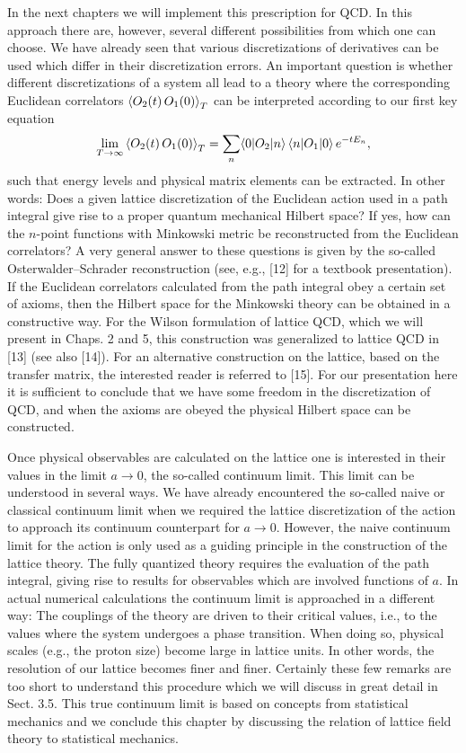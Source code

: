 In the next chapters we will implement this prescription for QCD. In this
approach there are, however, several different possibilities from which one can
choose. We have already seen that various discretizations of derivatives can be
used which differ in their discretization errors. An important question is
whether different discretizations of a system all lead to a theory where the
corresponding Euclidean correlators $\left\langle O_2(t)\,O_1(0) \right\rangle_T$ can be interpreted
according to our first key equation
\begin{equation}
  \lim_{T\to\infty}\left\langle O_2(t)\,O_1(0) \right\rangle_T
  = \sum_n \langle0|O_2|n\rangle\,\langle n|O_1|0\rangle\,e^{-tE_n},
\end{equation}
such that energy levels and physical matrix elements can be extracted. In other
words: Does a given lattice discretization of the Euclidean action used in a
path integral give rise to a proper quantum mechanical Hilbert space? If yes,
how can the $n$-point functions with Minkowski metric be reconstructed from the
Euclidean correlators? A very general answer to these questions is given by the
so-called Osterwalder--Schrader reconstruction (see, e.g., [12] for a textbook
presentation). If the Euclidean correlators calculated from the path integral
obey a certain set of axioms, then the Hilbert space for the Minkowski theory
can be obtained in a constructive way. For the Wilson formulation of lattice
QCD, which we will present in Chaps. 2 and 5, this construction was generalized
to lattice QCD in [13] (see also [14]). For an alternative construction on the
lattice, based on the transfer matrix, the interested reader is referred to
[15]. For our presentation here it is sufficient to conclude that we have some
freedom in the discretization of QCD, and when the axioms are obeyed the
physical Hilbert space can be constructed.

Once physical observables are calculated on the lattice one is interested in
their values in the limit $a \to 0$, the so-called continuum limit. This limit
can be understood in several ways. We have already encountered the so-called
naive or classical continuum limit when we required the lattice discretization
of the action to approach its continuum counterpart for $a \to 0$. However, the
naive continuum limit for the action is only used as a guiding principle in the
construction of the lattice theory. The fully quantized theory requires the
evaluation of the path integral, giving rise to results for observables which
are involved functions of $a$. In actual numerical calculations the continuum
limit is approached in a different way: The couplings of the theory are driven
to their critical values, i.e., to the values where the system undergoes a
phase transition. When doing so, physical scales (e.g., the proton size) become
large in lattice units. In other words, the resolution of our lattice becomes
finer and finer. Certainly these few remarks are too short to understand this
procedure which we will discuss in great detail in Sect. 3.5. This true
continuum limit is based on concepts from statistical mechanics and we conclude
this chapter by discussing the relation of lattice field theory to statistical
mechanics.

